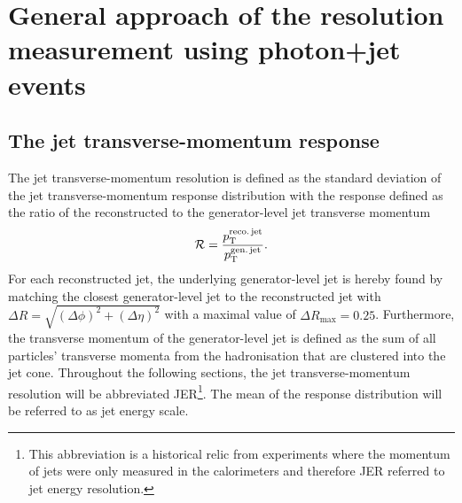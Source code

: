\FloatBarrier
\chapter{General approach of the resolution measurement using photon+jet events}
\label{res:ch:GeneralApproach}

\section{The jet transverse-momentum response}
The jet transverse-momentum resolution is defined as the standard deviation of the jet transverse-momentum response distribution with the response defined as the ratio of the reconstructed to the generator-level jet transverse momentum 
\begin{equation}\label{res:eq:responseFormula}
\mathcal{R} =  \frac{{p}_\mathrm{T}^{\text{reco.\,jet}}}{{p}_\mathrm{T}^{\text{gen.\,jet}}}.
\end{equation}
For each reconstructed jet, the underlying generator-level jet is hereby found by matching the closest generator-level jet to the reconstructed jet with $\Delta R = \sqrt{(\Delta \phi)^2 + (\Delta \eta)^2}$ 
with a maximal value of $\Delta R_{\text{max}}=0.25$.
Furthermore, the transverse momentum of the generator-level jet is defined as the sum of all particles' transverse momenta from the hadronisation that are clustered into the jet cone.
Throughout the following sections, the jet transverse-momentum resolution will be abbreviated JER\footnote{This abbreviation is a historical relic from experiments where the momentum of jets were only measured in the calorimeters and therefore JER referred to jet energy resolution.}.
The mean of the response distribution will be referred to as jet energy scale.

